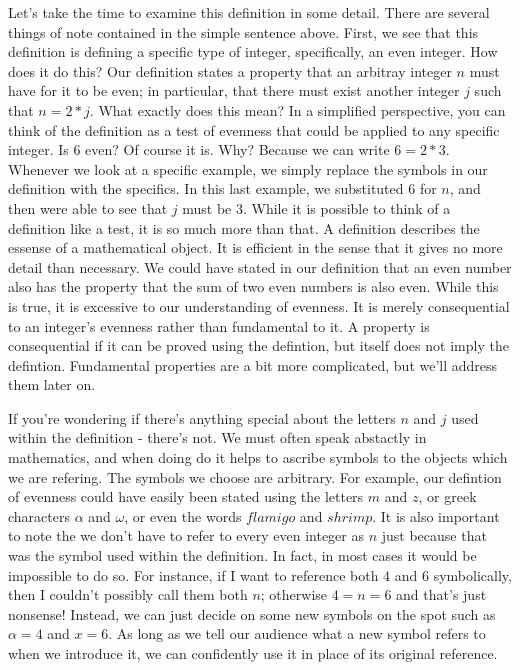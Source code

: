 \documentclass[a4paper,12pt]{article}
\begin{document}
Let's take the time to examine this definition in some detail. There are several things of note contained in the simple sentence above. First, we see that this definition is defining a specific type of integer, specifically, an even integer. How does it do this? Our definition states a property that an arbitray integer $n$ must have for it to be even; in particular, that there must exist another integer $j$ such that $n = 2*j$. What exactly does this mean? In a simplified perspective, you can think of the definition as a test of evenness that could be applied to any specific integer. Is $6$ even? Of course it is. Why? Because we can write $6 = 2*3$. Whenever we look at a specific example, we simply replace the symbols in our definition with the specifics. In this last example, we substituted $6$ for $n$, and then were able to see that $j$ must be $3$. While it is possible to think of a definition like a test, it is so much more than that. A definition describes the essense of a mathematical object. It is efficient in the sense that it gives no more detail than necessary. We could have stated in our definition that an even number also has the property that the sum of two even numbers is also even. While this is true, it is excessive to our understanding of evenness. It is merely consequential to an integer's evenness rather than fundamental to it. A property is consequential if it can be proved using the defintion, but itself does not imply the defintion. Fundamental properties are a bit more complicated, but we'll address them later on. 

If you're wondering if there's anything special about the letters $n$ and $j$ used within the definition - there's not. We must often speak abstactly in mathematics, and when doing do it helps to ascribe symbols to the objects which we are refering. The symbols we choose are arbitrary. For example, our defintion of evenness could have easily been stated using the letters $m$ and $z$, or greek characters $\alpha$ and $\omega$, or even the words $flamigo$ and $shrimp$. It is also important to note the we don't have to refer to every even integer as $n$ just because that was the symbol used within the definition. In fact, in most cases it would be impossible to do so. For instance, if I want to reference both $4$ and $6$ symbolically, then I couldn't possibly call them both $n$; otherwise $4 = n = 6$ and that's just nonsense! Instead, we can just decide on some new symbols on the spot such as $\alpha = 4$ and $x = 6$. As long as we tell our audience what a new symbol refers to when we introduce it, we can confidently use it in place of its original reference.  
\end{document}
